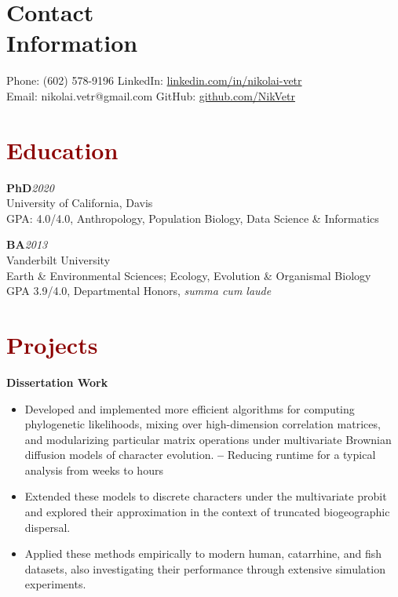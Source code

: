 \documentclass[11pt,margin,line]{resume}
\begin{document}
\name{\huge \textcolor{DarkRed}{Nikolai Vetr}}
\begin{resume}
\vspace{-5mm}
\section{\mysidestyle Contact\\Information}
    Phone: (602) 578-9196       \hfill LinkedIn: \url{linkedin.com/in/nikolai-vetr} \\
\noindent Email: nikolai.vetr@gmail.com  \hfill GitHub: \url{github.com/NikVetr} \vspace{0mm}\\\vspace{-6.5mm}

\section{\large\textcolor{DarkRed}{Education}}
   
\textbf{PhD}\hfill\emph{2020}\\
University of California, Davis\\
GPA: 4.0/4.0, Anthropology, Population Biology, Data Science \& Informatics
\vspace{-0.25em}

\textbf{BA}\hfill\emph{2013}\\
Vanderbilt University\\
Earth \& Environmental Sciences; Ecology, Evolution \& Organismal Biology\\
GPA 3.9/4.0, Departmental Honors, \textit{summa cum laude}\\
\vspace{-1.25em}

\section{\large\textcolor{DarkRed}{Projects}}

\textbf{Dissertation Work}
\begin{itemize}[noitemsep]
\item Developed and implemented more efficient algorithms for computing phylogenetic likelihoods, mixing over high-dimension correlation matrices, and modularizing particular matrix operations under multivariate Brownian diffusion models of character evolution.
\subitem \textbf{--} Reducing runtime for a typical analysis from weeks to hours
\item Extended these models to discrete characters under the multivariate probit and explored their approximation in the context of truncated biogeographic dispersal. 
\item Applied these methods empirically to modern human, catarrhine, and fish datasets, also investigating their performance through extensive simulation experiments. 
\end{itemize}


\end{resume}
\end{document}
